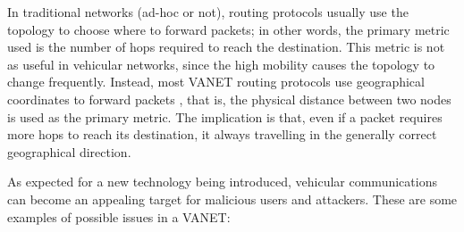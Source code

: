 

In traditional networks (ad-hoc or not), routing protocols usually use the topology to choose where to forward packets; in other words, the primary metric used is the number of hops required to reach the destination.
This metric is not as useful in vehicular networks, since the high mobility causes the topology to change frequently.
Instead, most VANET routing protocols use geographical coordinates to forward packets \citep{saini2015close}, that is, the physical distance between two nodes is used as the primary metric.
The implication is that, even if a packet requires more hops to reach its destination, it always travelling in the generally correct geographical direction.


As expected for a new technology being introduced, vehicular communications can become an appealing target for malicious users and attackers.
These are some examples of possible issues in a VANET:

